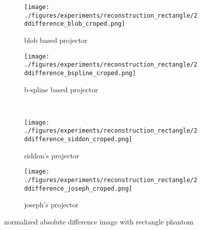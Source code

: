 \begin{figure}[h]
	\centering
	\begin{subfigure}[b]{0.45\textwidth}
		\centering
		\texttt{[image: ./figures/experiments/reconstruction\_rectangle/2ddifference\_blob\_croped.png]}
		\caption{blob based projector}%
		\label{fig:rectangle_recon_difference_blob}
	\end{subfigure}
	\begin{subfigure}[b]{0.45\textwidth}
		\centering
		\texttt{[image: ./figures/experiments/reconstruction\_rectangle/2ddifference\_bspline\_croped.png]}
		\caption{b-spline based projector}%
		\label{fig:rectangle_recon_difference_bspline}
	\end{subfigure} \\
	\begin{subfigure}[b]{0.45\textwidth}
		\centering
		\texttt{[image: ./figures/experiments/reconstruction\_rectangle/2ddifference\_siddon\_croped.png]}
		\caption{siddon's projector}%
		\label{fig:rectangle_recon_difference_siddon}
	\end{subfigure}
	\begin{subfigure}[b]{0.45\textwidth}
		\centering
		\texttt{[image: ./figures/experiments/reconstruction\_rectangle/2ddifference\_joseph\_croped.png]}
		\caption{joseph's projector}%
		\label{fig:rectangle_recon_difference_joseph}
	\end{subfigure}
	\caption{normalized absolute difference image with rectangle phantom}%
	\label{fig:rectangle_recon_difference}
\end{figure}

